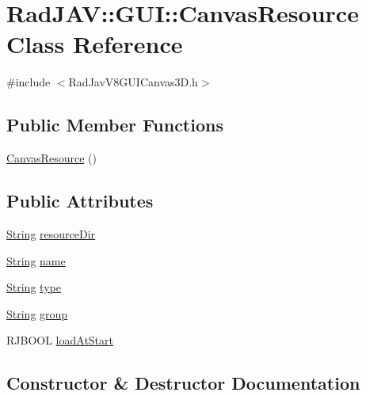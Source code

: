 \hypertarget{class_rad_j_a_v_1_1_g_u_i_1_1_canvas_resource}{}\section{Rad\+J\+AV\+:\+:G\+UI\+:\+:Canvas\+Resource Class Reference}
\label{class_rad_j_a_v_1_1_g_u_i_1_1_canvas_resource}


{\ttfamily \#include $<$Rad\+Jav\+V8\+G\+U\+I\+Canvas3\+D.\+h$>$}

\subsection*{Public Member Functions}
\begin{DoxyCompactItemize}
\item 
\mbox{\hyperlink{class_rad_j_a_v_1_1_g_u_i_1_1_canvas_resource_ad3baa88360c1095d4ce8db3933ff82dc}{Canvas\+Resource}} ()
\end{DoxyCompactItemize}
\subsection*{Public Attributes}
\begin{DoxyCompactItemize}
\item 
\mbox{\hyperlink{class_rad_j_a_v_1_1_string}{String}} \mbox{\hyperlink{class_rad_j_a_v_1_1_g_u_i_1_1_canvas_resource_a45a9ca17ea94e9127ca96374e16bdcda}{resource\+Dir}}
\item 
\mbox{\hyperlink{class_rad_j_a_v_1_1_string}{String}} \mbox{\hyperlink{class_rad_j_a_v_1_1_g_u_i_1_1_canvas_resource_a77c2362f840ae67e2d560ceee72ef985}{name}}
\item 
\mbox{\hyperlink{class_rad_j_a_v_1_1_string}{String}} \mbox{\hyperlink{class_rad_j_a_v_1_1_g_u_i_1_1_canvas_resource_a84e3d66c71acd6ba4aa339bb4e1e2034}{type}}
\item 
\mbox{\hyperlink{class_rad_j_a_v_1_1_string}{String}} \mbox{\hyperlink{class_rad_j_a_v_1_1_g_u_i_1_1_canvas_resource_a0a3dfdd8a3519cfb4c41da1eeb77242e}{group}}
\item 
R\+J\+B\+O\+OL \mbox{\hyperlink{class_rad_j_a_v_1_1_g_u_i_1_1_canvas_resource_ab7ef927cda726e49621cb151212285fe}{load\+At\+Start}}
\end{DoxyCompactItemize}


\subsection{Constructor \& Destructor Documentation}
\mbox{\label{class_rad_j_a_v_1_1_g_u_i_1_1_canvas_resource_ad3baa88360c1095d4ce8db3933ff82dc}} 
